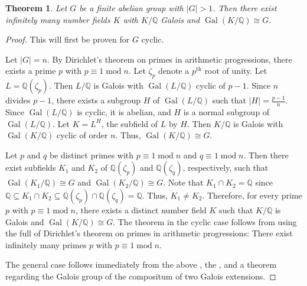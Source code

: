 \documentclass[12pt]{article}
\newtheorem*{thm*}{Theorem}
\begin{document}

\begin{thm*}
Let $G$ be a finite abelian group with $|G|>1$.  Then there exist infinitely many number fields $K$ with $K/\mathbb{Q}$ Galois and $\operatorname{Gal}(K/\mathbb{Q}) \cong G$.
\end{thm*}

\begin{proof}
This will first be proven for $G$ cyclic.

Let $|G|=n$.  By Dirichlet's theorem on primes in arithmetic progressions, there exists a prime $p$ with $p \equiv 1 \operatorname{mod} n$.  Let $\zeta_p$ denote a  $p^{\text{th}}$ root of unity.  Let $L=\mathbb{Q}(\zeta_p)$.  Then $L/\mathbb{Q}$ is Galois with $\operatorname{Gal}(L/\mathbb{Q})$ cyclic of  $p-1$.  Since $n$ divides $p-1$, there exists a subgroup $H$ of $\operatorname{Gal}(L/\mathbb{Q})$ such that $\displaystyle |H|=\frac{p-1}{n}$.  Since $\operatorname{Gal}(L/\mathbb{Q})$ is cyclic, it is abelian, and $H$ is a normal subgroup of $\operatorname{Gal}(L/\mathbb{Q})$.  Let $K=L^H$, the subfield of $L$  by $H$.  Then $K/\mathbb{Q}$ is Galois with $\operatorname{Gal}(K/\mathbb{Q})$ cyclic of order $n$.  Thus, $\operatorname{Gal}(K/\mathbb{Q}) \cong G$.

Let $p$ and $q$ be distinct primes with $p \equiv 1 \operatorname{mod} n$ and $q \equiv 1 \operatorname{mod} n$.  Then there exist subfields $K_1$ and $K_2$ of $\mathbb{Q}(\zeta_p)$ and $\mathbb{Q}(\zeta_q)$, respectively, such that $\operatorname{Gal}(K_1/\mathbb{Q}) \cong G$ and $\operatorname{Gal}(K_2/\mathbb{Q}) \cong G$.  Note that $K_1 \cap K_2=\mathbb{Q}$ since $\mathbb{Q} \subseteq K_1 \cap K_2 \subseteq \mathbb{Q}(\zeta_p) \cap \mathbb{Q}(\zeta_q)=\mathbb{Q}$.  Thus, $K_1 \neq K_2$.  Therefore, for every prime $p$ with $p \equiv 1 \operatorname{mod} n$, there exists a distinct number field $K$ such that $K/\mathbb{Q}$ is Galois and $\operatorname{Gal}(K/\mathbb{Q}) \cong G$.  The theorem in the cyclic case follows from using the full  of Dirichlet's theorem on primes in arithmetic progressions:  There exist infinitely many primes $p$ with $p \equiv 1 \operatorname{mod} n$.

The general case follows immediately from the above , the , and a theorem regarding the Galois group of the compositum of two Galois extensions.
\end{proof}
\end{document}
